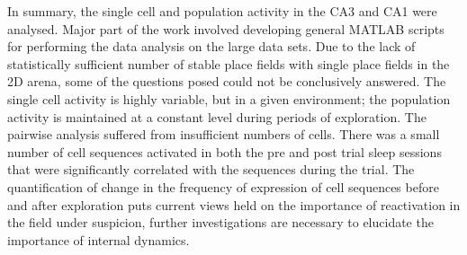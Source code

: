 In summary, the single cell and population activity in the CA3 and CA1 were analysed. Major part of the work involved developing general MATLAB scripts for performing the data analysis on the large data sets. Due to the lack of statistically sufficient number of stable place fields with single place fields in the 2D arena, some of the questions posed could not be conclusively answered. The single cell activity is highly variable, but in a given environment; the population activity is maintained at a constant level during periods of exploration. The pairwise analysis suffered from insufficient numbers of cells. There was a small number of cell sequences activated in both the pre and post trial sleep sessions that were significantly correlated with the sequences during the trial. The quantification of change in the frequency of expression of cell sequences before and after exploration puts current views held on the importance of reactivation in the field under suspicion, further investigations are necessary to elucidate the importance of internal dynamics. 





